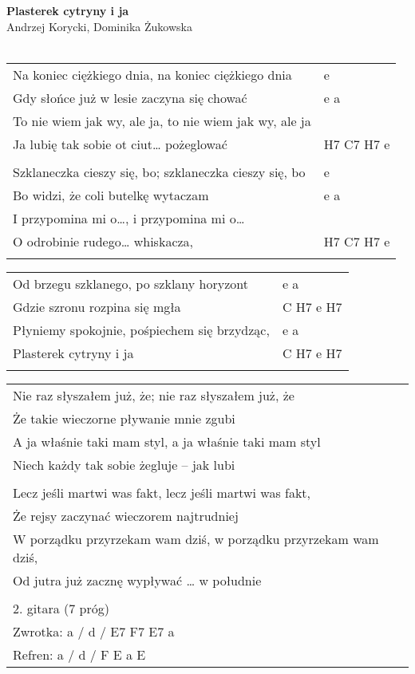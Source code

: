 \documentclass[a5paper]{article}
\begin{document}


\noindent
\fontsize{12pt}{15pt}\selectfont
\textbf{Plasterek cytryny i ja} \\
\fontsize{8pt}{10pt}\selectfont
Andrzej Korycki, Dominika Żukowska \\ \\
\fontsize{10pt}{12pt}\selectfont
{}
\begin{tabular}{@{}p{8.50cm}p{3cm}@{}}
\noindent
Na koniec ciężkiego dnia, na koniec ciężkiego dnia & e \\
Gdy słońce już w lesie zaczyna się chować & e a \\
To nie wiem jak wy, ale ja, to nie wiem jak wy, ale ja \\
Ja lubię tak sobie ot ciut… pożeglować & H7 C7 H7 e \\ \\

Szklaneczka cieszy się, bo; szklaneczka cieszy się, bo & e \\
Bo widzi, że coli butelkę wytaczam & e a \\
I przypomina mi o…, i przypomina mi o… \\
O odrobinie rudego… whiskacza, & H7 C7 H7 e \\ \\
\end{tabular}

\noindent
\begin{tabular}{@{}p{7.50cm}p{3cm}@{}}
Od brzegu szklanego, po szklany horyzont & e a \\
Gdzie szronu rozpina się mgła & C H7 e H7 \\
Płyniemy spokojnie, pośpiechem się brzydząc, & e a \\
Plasterek cytryny i ja & C H7 e H7 \\ \\
\end{tabular}

\noindent
\begin{tabular}{@{}p{11.50cm}@{}}
Nie raz słyszałem już, że; nie raz słyszałem już, że \\
Że takie wieczorne pływanie mnie zgubi \\
A ja właśnie taki mam styl, a ja właśnie taki mam styl \\
Niech każdy tak sobie żegluje – jak lubi \\ \\

Lecz jeśli martwi was fakt, lecz jeśli martwi was fakt, \\
Że rejsy zaczynać wieczorem najtrudniej \\
W porządku przyrzekam wam dziś, w porządku przyrzekam wam dziś, \\
Od jutra już zacznę wypływać … w południe \\ \\

2. gitara (7 próg) \\
Zwrotka: a / d / E7 F7 E7 a \\
Refren: a / d / F E a E
\end{tabular}
\end{document}
